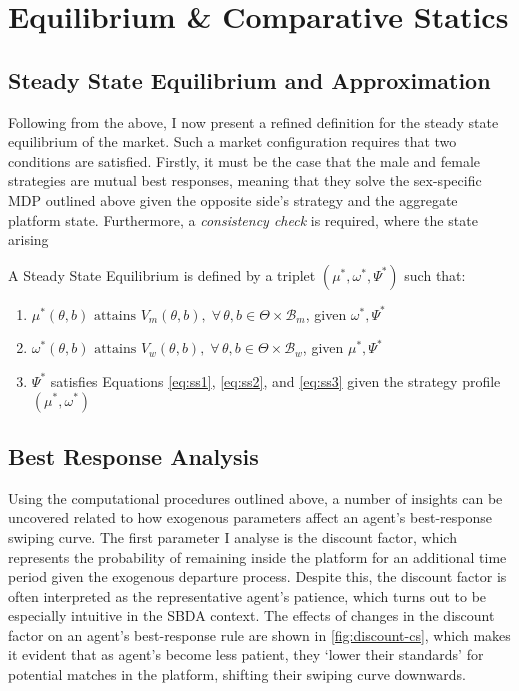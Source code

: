 \section{Equilibrium \& Comparative Statics}
\label{sec:section3} 
\subsection{Steady State Equilibrium and Approximation}\label{sec:section3.1} 
Following from the above, I now present a refined definition for the steady state equilibrium of the market. Such a market configuration requires that two conditions are satisfied. Firstly, it must be the case that the male and female strategies are mutual best responses, meaning that they solve the sex-specific MDP outlined above given the opposite side's strategy and the aggregate platform state. Furthermore, a \textit{consistency check} is required, where the state arising  
\begin{definition}
    A Steady State Equilibrium is defined by a triplet $(\mu^*, \omega^*, \Psi^*)$ such that:
    \begin{enumerate}
        \item $ \mu^*(\theta,b) \text{ attains } V_m(\theta,b), \; \forall\, \theta, b \in \Theta \times \mathcal{B}_m$, given $\omega^*,\Psi^*$
        \item $ \omega^*(\theta,b) \text{ attains } V_w(\theta,b), \; \forall\, \theta, b \in \Theta \times \mathcal{B}_w$, given $\mu^*,\Psi^*$
        \item $\Psi^*$ satisfies Equations \ref{eq:ss1}, \ref{eq:ss2}, and \ref{eq:ss3} given the strategy profile $(\mu^*, \omega^*)$
    \end{enumerate} 
\end{definition}
\begin{comment}
\begin{itemize}
    \item Define and explain concept of SSE
    \item Explain computation via least-squares
    \item Explain main properties (eg. ESS \& uniqueness)
\end{itemize} 
\end{comment}
\subsection{Best Response Analysis}\label{sec:section3.2} 
Using the computational procedures outlined above, a number of insights can be uncovered related to how exogenous parameters affect an agent's best-response swiping curve. The first parameter I analyse is the discount factor, which represents the probability of remaining inside the platform for an additional time period given the exogenous departure process. Despite this, the discount factor is often interpreted as the representative agent's patience, which turns out to be especially intuitive in the SBDA context. The effects of changes in the discount factor on an agent's best-response rule are shown in \autoref{fig:discount-cs}, which makes it evident that as agent's become less patient, they `lower their standards' for potential matches in the platform, shifting their swiping curve downwards. 

